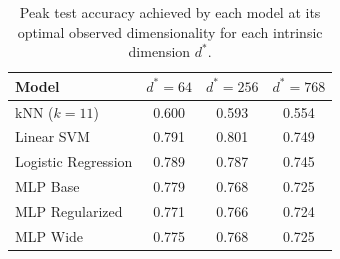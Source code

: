 \begin{table}[h]
\centering
\begin{tabular}{lccc}
\toprule
\textbf{Model} & \textbf{$d^*=64$} & \textbf{$d^*=256$} & \textbf{$d^*=768$} \\
\midrule
kNN ($k=11$) & 0.600 & 0.593 & 0.554 \\
Linear SVM & 0.791 & 0.801 & 0.749 \\
Logistic Regression & 0.789 & 0.787 & 0.745 \\
MLP Base & 0.779 & 0.768 & 0.725 \\
MLP Regularized & 0.771 & 0.766 & 0.724 \\
MLP Wide & 0.775 & 0.768 & 0.725 \\
\bottomrule
\end{tabular}
\caption{Peak test accuracy achieved by each model at its optimal observed dimensionality for each intrinsic dimension $d^*$.}
\label{tab:peak_performance}
\end{table}
